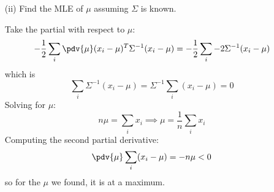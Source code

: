 \documentclass{article}
\begin{document}
\begin{itemize}
\begin{itemize}
                \item [(ii)] Find the MLE of $\mu$ assuming $\Sigma$ is known.
                    \begin{answer}
                        Take the partial with respect to $\mu$:
                            \begin{equation*}
                                -\dfrac{1}{2}\sum_{i}\pdv{\mu}(x_{i} - \mu)^{T} \Sigma^{-1}(x_{i} - \mu) = -\dfrac{1}{2}\sum_{i} -2\Sigma^{-1}(x_{i} - \mu)
                            \end{equation*}
                        which is
                            \begin{equation*}
                                \sum_{i} \Sigma^{-1}(x_{i} - \mu) = \Sigma^{-1}\sum_{i}(x_{i} - \mu) = 0
                            \end{equation*}
                        Solving for $\mu$:
                            \begin{equation*}
                                n\mu = \sum_{i} x_{i} \implies \mu = \dfrac{1}{n} \sum_{i} x_{i}
                            \end{equation*}
                        Computing the second partial derivative:
                            \begin{equation*}
                                \pdv{\mu} \sum_{i} (x_{i} - \mu) = -n\mu < 0
                            \end{equation*}
                        so for the $\mu$ we found, it is at a maximum.

                    \end{answer}


\end{itemize}
\end{itemize}
\end{document}
